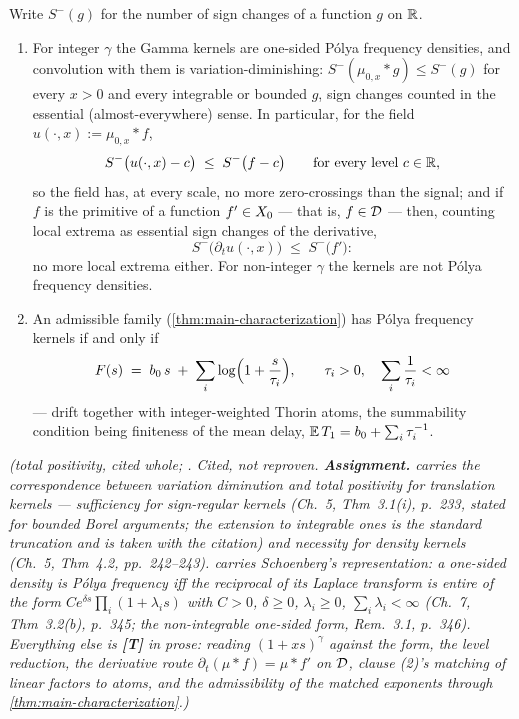 \begin{proposition}\label{prop:gamma-regularity}
Write $S^-(g)$ for the number of sign changes of a function $g$ on $\mathbb{R}$.
\begin{enumerate}
\item For integer $\gamma$ the Gamma kernels are one-sided P\'olya frequency densities, and
convolution with them is variation-diminishing: $S^-(\mu_{0,x} * g) \le S^-(g)$ for every
$x > 0$ and every integrable or bounded $g$, sign changes counted in the essential
(almost-everywhere) sense. In particular, for the field $u(\cdot, x) := \mu_{0,x} * f$,
\[
  S^-\bigl(u(\cdot, x) - c\bigr) \;\le\; S^-\bigl(f - c\bigr)
  \qquad \text{for every level } c \in \mathbb{R},
\]
so the field has, at every scale, no more zero-crossings than the signal; and if $f$ is
the primitive of a function $f' \in X_0$ --- that is, $f \in \mathcal{D}$ --- then, counting
local extrema as essential sign changes of the derivative,
\[
  S^-\bigl(\partial_t u(\cdot, x)\bigr) \;\le\; S^-\bigl(f'\bigr):
\]
no more local extrema either. For non-integer $\gamma$ the kernels are not P\'olya frequency
densities.
\item An admissible family (\ref{thm:main-characterization}) has P\'olya frequency
kernels if and only if
\[
  F(s) \;=\; b_0\,s \;+\; \sum_{i} \log\Bigl(1 + \frac{s}{\tau_i}\Bigr),
  \qquad \tau_i > 0, \quad \sum_i \frac{1}{\tau_i} < \infty
\]
--- drift together with integer-weighted Thorin atoms, the summability condition being
finiteness of the mean delay, $\mathbb{E}\,T_1 = b_0 + \sum_i \tau_i^{-1}$.
\end{enumerate}
\statusA\quad{}\quad{}\quad\emph{(total positivity, cited whole;
. Cited, not reproven.
\textbf{Assignment.}  carries the correspondence between variation diminution
and total positivity for translation kernels --- sufficiency for sign-regular kernels
(Ch.~5, Thm~3.1(i), p.~233, stated for bounded Borel arguments; the extension to
integrable ones is the standard truncation and is taken with the citation) and necessity
for density kernels (Ch.~5, Thm~4.2, pp.~242--243).  carries Schoenberg's
representation: a one-sided density is P\'olya frequency iff the reciprocal of its Laplace
transform is entire of the form $Ce^{\delta s}\prod_i(1+\lambda_i s)$ with $C > 0$,
$\delta \ge 0$, $\lambda_i \ge 0$, $\sum_i \lambda_i < \infty$ (Ch.~7, Thm~3.2(b), p.~345;
the non-integrable one-sided form, Rem.~3.1, p.~346). Everything else is \textbf{[T]} in
prose: reading $(1+xs)^{\gamma}$ against the form, the level reduction, the derivative
route $\partial_t(\mu * f) = \mu * f'$ on $\mathcal{D}$, clause (2)'s matching of linear factors
to atoms, and the admissibility of the matched exponents through
\ref{thm:main-characterization}.)}
\end{proposition}

